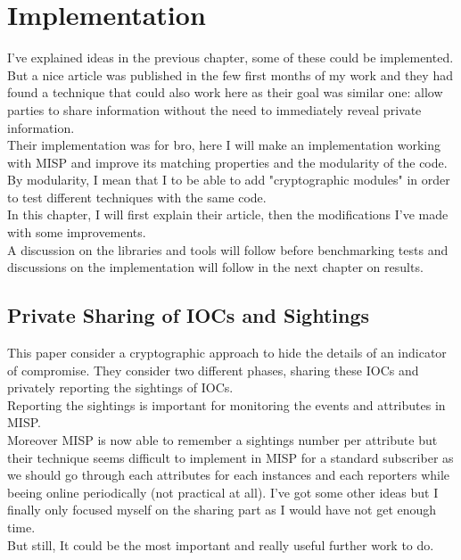 \documentclass{eplmastersthesis}
\begin{document}
\chapter{Implementation}
I've explained ideas in the previous chapter, some of these could be implemented. But a nice article \cite{van2016private} was published in the few first months of my work and they had found a technique that could also work here as their goal was similar one: allow parties to share information without the need to immediately reveal private information.\\
Their implementation was for bro, here I will make an implementation working with MISP and improve its matching properties and the modularity of the code. \\
By modularity, I mean that I to be able to add "cryptographic modules" in order to test different techniques with the same code.\\
In this chapter, I will first explain their article, then the modifications I've made with some improvements.\\
A discussion on the libraries and tools will follow before benchmarking tests and discussions on the implementation will follow in the next chapter on results.

\section{Private Sharing of IOCs and Sightings \cite{van2016private}}
This paper consider a cryptographic approach to hide the details of an indicator of compromise. They consider two different phases, sharing these IOCs and privately reporting the sightings of IOCs.\\

Reporting the sightings is important for monitoring the events and attributes in MISP.\\ 
Moreover MISP is now able to remember a sightings number per attribute but their technique seems difficult to implement in MISP for a standard subscriber as we should go through each attributes for each instances and each reporters while beeing online periodically (not practical at all). I've got some other ideas but I finally only focused myself on the sharing part as I would have not get enough time.\\ 
But still, It could be the most important and really useful further work to do.\\
\end{document}
